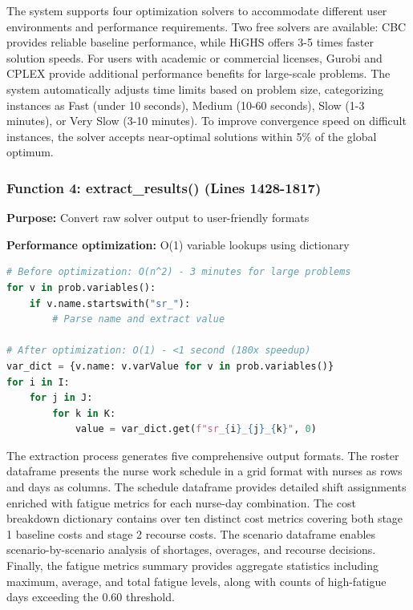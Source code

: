 \documentclass[11pt,letterpaper]{article}
\begin{document}
The system supports four optimization solvers to accommodate different user environments and performance requirements. Two free solvers are available: CBC provides reliable baseline performance, while HiGHS offers 3-5 times faster solution speeds. For users with academic or commercial licenses, Gurobi and CPLEX provide additional performance benefits for large-scale problems. The system automatically adjusts time limits based on problem size, categorizing instances as Fast (under 10 seconds), Medium (10-60 seconds), Slow (1-3 minutes), or Very Slow (3-10 minutes). To improve convergence speed on difficult instances, the solver accepts near-optimal solutions within 5\% of the global optimum.

\subsubsection{Function 4: extract\_results() (Lines 1428-1817)}
\textbf{Purpose:} Convert raw solver output to user-friendly formats

\textbf{Performance optimization:} O(1) variable lookups using dictionary
\begin{lstlisting}[language=Python, caption=O(1) Lookup Optimization]
# Before optimization: O(n^2) - 3 minutes for large problems
for v in prob.variables():
    if v.name.startswith("sr_"):
        # Parse name and extract value

# After optimization: O(1) - <1 second (180x speedup)
var_dict = {v.name: v.varValue for v in prob.variables()}
for i in I:
    for j in J:
        for k in K:
            value = var_dict.get(f"sr_{i}_{j}_{k}", 0)
\end{lstlisting}

The extraction process generates five comprehensive output formats. The roster dataframe presents the nurse work schedule in a grid format with nurses as rows and days as columns. The schedule dataframe provides detailed shift assignments enriched with fatigue metrics for each nurse-day combination. The cost breakdown dictionary contains over ten distinct cost metrics covering both stage 1 baseline costs and stage 2 recourse costs. The scenario dataframe enables scenario-by-scenario analysis of shortages, overages, and recourse decisions. Finally, the fatigue metrics summary provides aggregate statistics including maximum, average, and total fatigue levels, along with counts of high-fatigue days exceeding the 0.60 threshold.
\end{document}

